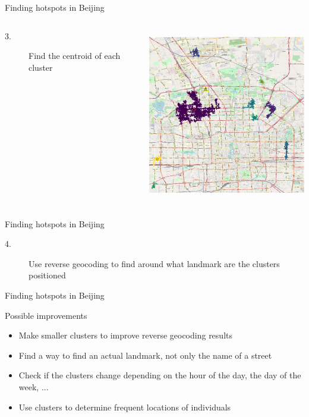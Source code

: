\documentclass[aspectratio=169]{beamer}
\begin{document}
\begin{frame}{Finding hotspots in Beijing}
\begin{columns}
\begin{column}{0.5\textwidth}
\begin{description}
	\item [3.] Find the centroid of each cluster
\end{description}
\end{column}
\begin{column}{0.5\textwidth}  %
     \centering
	\includegraphics[height=7.5cm]{figures/annotated_map}
\end{column}
\end{columns}
\end{frame}

\begin{frame}{Finding hotspots in Beijing}
\begin{center}
\begin{description}
	\item [4.] Use reverse geocoding to find around what landmark are the clusters positioned
\end{description}
{\small }
\end{center}
\end{frame}

\begin{frame}{Finding hotspots in Beijing}

{\Large Possible improvements}
\vspace{.5cm}
\begin{itemize}
	\item Make smaller clusters to improve reverse geocoding results
	\item Find a way to find an actual landmark, not only the name of a street
	\item Check if the clusters change depending on the hour of the day, the day of the week, ...
	\item Use clusters to determine frequent locations of individuals
\end{itemize}
\end{frame}
\end{document}
